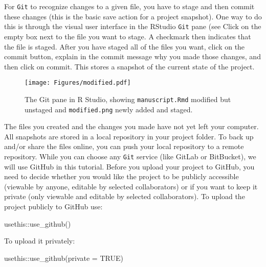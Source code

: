 \documentclass[psych,tutorial,accept,moreauthors,pdftex]{Definitions/mdpi}
\newenvironment{Shaded}{\begin{snugshade}}{\end{snugshade}}
\newcommand{\AttributeTok}[1]{\textcolor[rgb]{0.77,0.63,0.00}{#1}}
\newcommand{\ConstantTok}[1]{\textcolor[rgb]{0.00,0.00,0.00}{#1}}
\newcommand{\FunctionTok}[1]{\textcolor[rgb]{0.00,0.00,0.00}{#1}}
\newcommand{\NormalTok}[1]{#1}
\newcommand{\SpecialCharTok}[1]{\textcolor[rgb]{0.00,0.00,0.00}{#1}}
\begin{document}
\begin{paracol}{2}
For \texttt{Git} to recognize changes to a given file, you have to stage
and then commit these changes (this is the basic save action for a
project snapshot). One way to do this is through the visual user
interface in the RStudio \texttt{Git} pane (see  %
 Click on
the empty box next to the file you want to stage. A checkmark then
indicates that the file is staged. After you have staged all of the
files you want, click on the commit button, explain in the commit
message why you made those changes, and then click on commit. This
stores a snapshot of the current state of the project.

\begin{figure}[H]
\texttt{[image: Figures/modified.pdf]}
\caption{The Git pane in R Studio, showing
\texttt{manuscript.Rmd} modified but unstaged and \texttt{modified.png}
newly added and staged.}
\label{figure2}
\end{figure}

The files you created and the changes you made have not yet left your
computer. All snapshots are stored in a local repository in your project
folder. To back up and/or share the files online, you can push your
local repository to a remote repository. While you can choose any
\texttt{Git} service (like GitLab or BitBucket), we will use GitHub in
this tutorial. Before you upload your project to GitHub, you need to
decide whether you would like the project to be publicly accessible
(viewable by anyone, editable by selected collaborators) or if you want
to keep it private (only viewable and editable by selected
collaborators). To upload the project publicly to GitHub use:

\begin{adjustwidth}{0.5cm}{0cm} 
\begin{Shaded}
\begin{Highlighting}[]
\NormalTok{usethis}\SpecialCharTok{::}\FunctionTok{use\_github}\NormalTok{()}
\end{Highlighting}
\end{Shaded}
\end{adjustwidth}

To upload it privately:

\begin{adjustwidth}{0.5cm}{0cm} 
\begin{Shaded}
\begin{Highlighting}[]
\NormalTok{usethis}\SpecialCharTok{::}\FunctionTok{use\_github}\NormalTok{(}\AttributeTok{private =} \ConstantTok{TRUE}\NormalTok{)}
\end{Highlighting}
\end{Shaded}
\end{adjustwidth}


\end{paracol}
\end{document}
